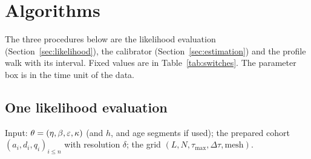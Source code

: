 \section{Algorithms}\label{sec:si-algorithms}

The three procedures below are the likelihood evaluation (Section~\ref{sec:likelihood}), the calibrator
(Section~\ref{sec:estimation}) and the profile walk with its interval. Fixed values are in Table~\ref{tab:switches}. The
parameter box is in the time unit of the data.

\subsection{One likelihood evaluation}\label{sec:si-alg-lik}

Input: $\theta=(\eta,\beta,\varepsilon,\kappa)$ (and $h$, and age segments if used); the prepared cohort $(a_i,d_i,q_i)_{i\le n}$ with
resolution $\delta$; the grid $(L,N,\tau_{\max},\Delta\tau,\text{mesh})$.
